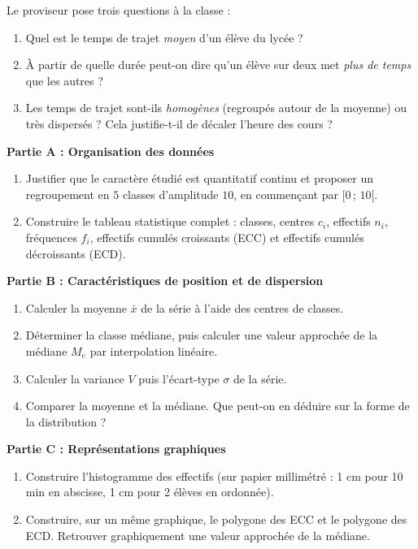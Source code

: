 \documentclass[11pt]{article}
\newcounter{popsec}
\newcounter{popsub}
\newcommand{\courssub}[1]{%
  \stepcounter{popsub}%
  \par\vspace{9pt}\noindent{\popxbold\fontsize{11.5}{13}\selectfont\color{popink}{\color{poporange}\thepopsec.\thepopsub}\hspace{6pt}#1}\par\nopagebreak\vspace{4pt}
}
\begin{document}
Le proviseur pose trois questions à la classe :
\begin{enumerate}
\item Quel est le temps de trajet \emph{moyen} d'un élève du lycée ?
\item À partir de quelle durée peut-on dire qu'un élève sur deux met \emph{plus de temps} que les autres ?
\item Les temps de trajet sont-ils \emph{homogènes} (regroupés autour de la moyenne) ou très dispersés ? Cela justifie-t-il de décaler l'heure des cours ?
\end{enumerate}

\courssub{Consignes}

\textbf{Partie A : Organisation des données}

\begin{enumerate}
\item Justifier que le caractère étudié est quantitatif continu et proposer un regroupement en $5$ classes d'amplitude $10$, en commençant par $[0\,;\,10[$.
\item Construire le tableau statistique complet : classes, centres $c_i$, effectifs $n_i$, fréquences $f_i$, effectifs cumulés croissants (ECC) et effectifs cumulés décroissants (ECD).
\end{enumerate}

\textbf{Partie B : Caractéristiques de position et de dispersion}

\begin{enumerate}[resume]
\item Calculer la moyenne $\bar{x}$ de la série à l'aide des centres de classes.
\item Déterminer la classe médiane, puis calculer une valeur approchée de la médiane $M_e$ par interpolation linéaire.
\item Calculer la variance $V$ puis l'écart-type $\sigma$ de la série.
\item Comparer la moyenne et la médiane. Que peut-on en déduire sur la forme de la distribution ?
\end{enumerate}

\textbf{Partie C : Représentations graphiques}

\begin{enumerate}[resume]
\item Construire l'histogramme des effectifs (sur papier millimétré : 1 cm pour 10 min en abscisse, 1 cm pour 2 élèves en ordonnée).
\item Construire, sur un même graphique, le polygone des ECC et le polygone des ECD. Retrouver graphiquement une valeur approchée de la médiane.
\end{enumerate}
\end{document}
